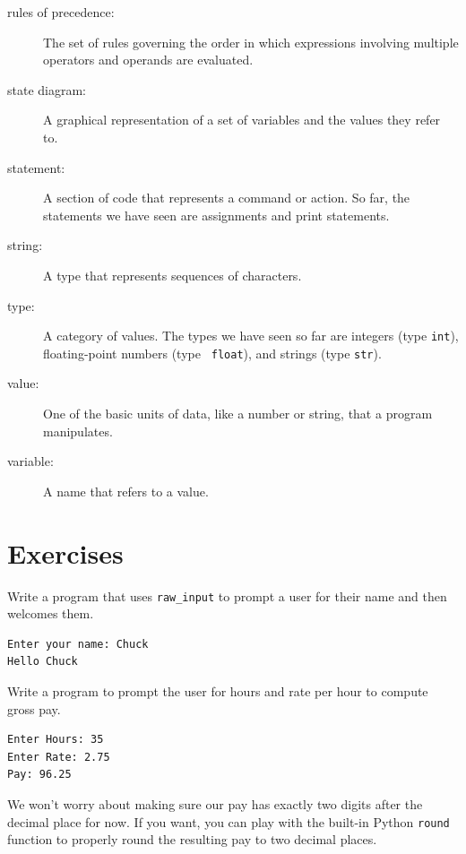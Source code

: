 \documentclass[10pt]{book}
\begin{document}
\begin{description}
\item[rules of precedence:]  The set of rules governing the order in which
expressions involving multiple operators and operands are evaluated.

\item[state diagram:]  A graphical representation of a set of variables and the
values they refer to.

\item[statement:]  A section of code that represents a command or action.  So
far, the statements we have seen are assignments and print statements.

\item[string:] A type that represents sequences of characters.

\item[type:] A category of values.  The types we have seen so far
are integers (type {\tt int}), floating-point numbers (type {\tt
float}), and strings (type {\tt str}).

\item[value:]  One of the basic units of data, like a number or string, 
that a program manipulates.

\item[variable:]  A name that refers to a value.

\end{description}

\section{Exercises}

\begin{ex}
Write a program that uses  \verb"raw_input" to prompt a user for their name 
and then welcomes them.

\begin{verbatim}
Enter your name: Chuck
Hello Chuck
\end{verbatim}

\end{ex}

\begin{ex}
Write a program to prompt the user for hours and rate per hour to compute
gross pay.
\begin{verbatim}
Enter Hours: 35
Enter Rate: 2.75
Pay: 96.25
\end{verbatim}
\end{ex}
%
We won't worry about making sure our pay has exactly two digits after
the decimal place for now.  If you want, you can play with the 
built-in Python {\tt round} function to properly round the resulting pay
to two decimal places.
\end{document}
